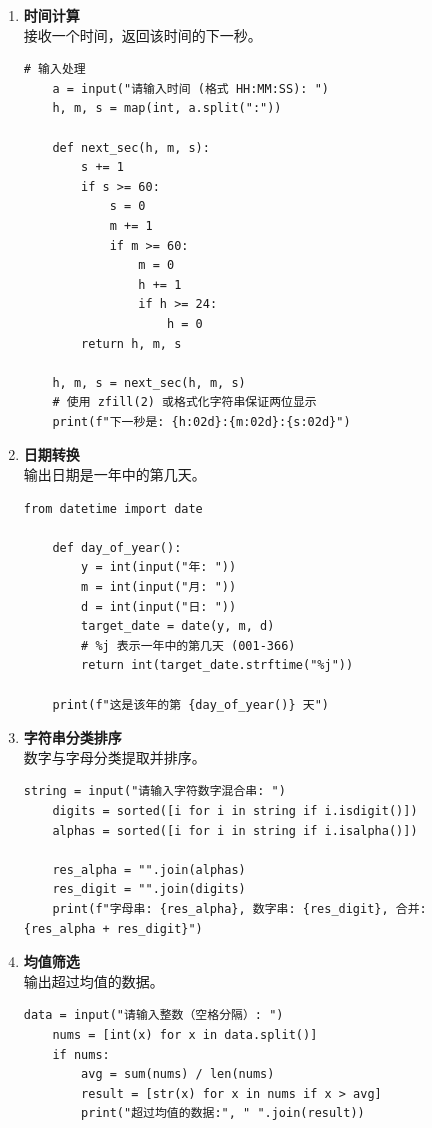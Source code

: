 \documentclass{article}
\begin{document}
\begin{enumerate}[label=\arabic*、, leftmargin=1.5cm]

    \item \textbf{时间计算} \\
    接收一个时间，返回该时间的下一秒。
    \begin{lstlisting}[caption=时间计算代码]
    # 输入处理
    a = input("请输入时间 (格式 HH:MM:SS): ")
    h, m, s = map(int, a.split(":"))

    def next_sec(h, m, s):
        s += 1
        if s >= 60:
            s = 0
            m += 1
            if m >= 60:
                m = 0
                h += 1
                if h >= 24:
                    h = 0
        return h, m, s

    h, m, s = next_sec(h, m, s)
    # 使用 zfill(2) 或格式化字符串保证两位显示
    print(f"下一秒是: {h:02d}:{m:02d}:{s:02d}")
    \end{lstlisting}

    \item \textbf{日期转换} \\
    输出日期是一年中的第几天。
    \begin{lstlisting}[caption=日期转换代码]
    from datetime import date

    def day_of_year():
        y = int(input("年: "))
        m = int(input("月: "))
        d = int(input("日: "))
        target_date = date(y, m, d)
        # %j 表示一年中的第几天 (001-366)
        return int(target_date.strftime("%j"))

    print(f"这是该年的第 {day_of_year()} 天")
    \end{lstlisting}

    \item \textbf{字符串分类排序} \\
    数字与字母分类提取并排序。
    \begin{lstlisting}[caption=字符串分类排序代码]
    string = input("请输入字符数字混合串: ")
    digits = sorted([i for i in string if i.isdigit()])
    alphas = sorted([i for i in string if i.isalpha()])

    res_alpha = "".join(alphas)
    res_digit = "".join(digits)
    print(f"字母串: {res_alpha}, 数字串: {res_digit}, 合并: {res_alpha + res_digit}")
    \end{lstlisting}

    \item \textbf{均值筛选} \\
    输出超过均值的数据。
    \begin{lstlisting}[caption=均值筛选代码]
    data = input("请输入整数（空格分隔）: ")
    nums = [int(x) for x in data.split()]
    if nums:
        avg = sum(nums) / len(nums)
        result = [str(x) for x in nums if x > avg]
        print("超过均值的数据:", " ".join(result))
    \end{lstlisting}


\end{enumerate}
\end{document}
